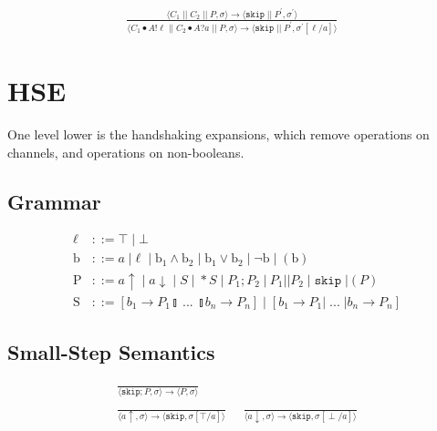 \documentclass[times,10pt]{article}
\begin{document}
\begin{align*}
\frac{ \langle C_1 \; || \; C_2 \; || \; P, \sigma \rangle \rightarrow \langle \mathtt{skip} \; || \; P^\prime , \sigma^\prime \rangle }{ \langle C_1 \bullet A!\ell \; || \; C_2 \bullet A?a \; || \; P , \sigma \rangle \rightarrow \langle  \mathtt{skip} \; || \; P^\prime, \sigma^\prime[\ell/a] \rangle } & 
\end{align*}

\section{HSE}

One level lower is the handshaking expansions, which remove operations on channels, and operations on non-booleans.

\subsection{Grammar}

\begin{align*}
\ell & ::= \top \; | \perp \\
\mathrm{b} & ::= a \; | \ell \; | \; \mathrm{b}_1 \wedge \mathrm{b}_2 \; | \; \mathrm{b}_1 \vee \mathrm{b}_2 \; | \; \lnot \mathrm{b} \; | \; ( \mathrm{b} ) \\
\mathrm{P} & ::= a\uparrow \; | \; a\downarrow \; | \; S \; | \; *S \; | \; P_1; P_2 \; | \: P_1 || P_2 \; | \; \mathtt{skip} \; | ( P )  \\
\mathrm{S} & ::= [ b_1 \rightarrow P_1  \talloblong \; ... \; \talloblong b_n \rightarrow P_n ] \; | \; [ b_1 \rightarrow P_1 | \; ... \; | b_n \rightarrow P_n ]
\end{align*}

\subsection{Small-Step Semantics}

\begin{align*}
\frac{}{\langle \mathtt{skip}; P, \sigma \rangle \rightarrow \langle P, \sigma \rangle } & \\ \\
\frac{}{\langle a \uparrow , \sigma\rangle \rightarrow \langle \mathtt{skip}, \sigma[\top/a]\rangle } &\;\; 
\frac{}{\langle a \downarrow , \sigma\rangle \rightarrow \langle \mathtt{skip}, \sigma[\perp/a]\rangle }
\end{align*}
\end{document}
